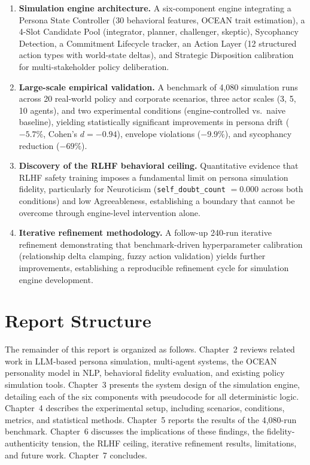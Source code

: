 \begin{enumerate}[leftmargin=*, itemsep=2pt]
    \item \textbf{Simulation engine architecture.} A six-component engine integrating a Persona State Controller (30 behavioral features, OCEAN trait estimation), a 4-Slot Candidate Pool (integrator, planner, challenger, skeptic), Sycophancy Detection, a Commitment Lifecycle tracker, an Action Layer (12 structured action types with world-state deltas), and Strategic Disposition calibration for multi-stakeholder policy deliberation.

    \item \textbf{Large-scale empirical validation.} A benchmark of 4,080 simulation runs across 20 real-world policy and corporate scenarios, three actor scales (3, 5, 10 agents), and two experimental conditions (engine-controlled vs.\ naive baseline), yielding statistically significant improvements in persona drift ($-5.7\%$, Cohen's $d = -0.94$), envelope violations ($-9.9\%$), and sycophancy reduction ($-69\%$).

    \item \textbf{Discovery of the RLHF behavioral ceiling.} Quantitative evidence that RLHF safety training imposes a fundamental limit on persona simulation fidelity, particularly for Neuroticism (\texttt{self\_doubt\_count} $= 0.000$ across both conditions) and low Agreeableness, establishing a boundary that cannot be overcome through engine-level intervention alone.

    \item \textbf{Iterative refinement methodology.} A follow-up 240-run iterative refinement demonstrating that benchmark-driven hyperparameter calibration (relationship delta clamping, fuzzy action validation) yields further improvements, establishing a reproducible refinement cycle for simulation engine development.
\end{enumerate}


\section{Report Structure}

The remainder of this report is organized as follows. Chapter~2 reviews related work in LLM-based persona simulation, multi-agent systems, the OCEAN personality model in NLP, behavioral fidelity evaluation, and existing policy simulation tools. Chapter~3 presents the system design of the simulation engine, detailing each of the six components with pseudocode for all deterministic logic. Chapter~4 describes the experimental setup, including scenarios, conditions, metrics, and statistical methods. Chapter~5 reports the results of the 4,080-run benchmark. Chapter~6 discusses the implications of these findings, the fidelity-authenticity tension, the RLHF ceiling, iterative refinement results, limitations, and future work. Chapter~7 concludes.
